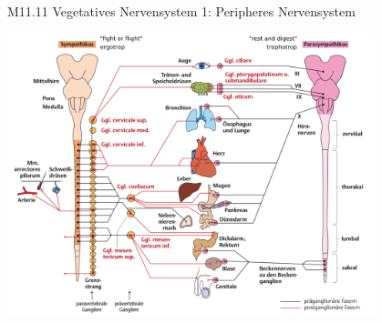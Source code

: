 \documentclass{beamer}
\begin{document}







\begin{frame}{M11.11 Vegetatives Nervensystem 1: Peripheres Nervensystem}

\begin{center}
    \includegraphics[width=0.8\textwidth]{Sympa_parasympa.png}
\end{center}

    
\end{frame}




\end{document}
